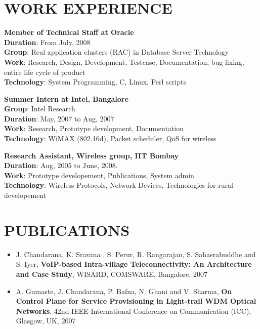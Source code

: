 \documentclass{res}
\begin{document}
\begin{resume}
					  \section{WORK EXPERIENCE} 
					  {\bf Member of Technical Staff at Oracle}
					  \\{\bf Duration}:  From July, 2008\\
					  {\bf Group}: Real application clusters (RAC) in Database Server Technology\\ 
					  {\bf Work}: Research, Design, Development, Testcase, Documentation, bug fixing, entire life cycle of product\\
					  {\bf Technology}: System Programming, C, Linux, Perl scripts

					  {\bf Summer Intern at Intel, Bangalore}\\
					  {\bf Group}: Intel Research 
					  \\{\bf Duration}: May, 2007 to Aug, 2007
					  \\{\bf Work}: Research, Prototype development, Documentation
					  \\{\bf Technology}: WiMAX (802.16d), Packet scheduler, QoS for wireless


					  {\bf Research Assistant, Wireless group, IIT Bombay} 
					  \\{\bf Duration}: Aug, 2005 to June, 2008.
					  \\{\bf Work}: Prototype developement, Publications, System admin
					  \\{\bf Technology}: Wireless Protocols, Network Devices, Technologies for rural developement  

					  \vspace{0.2in} 

				      \section{PUBLICATIONS} 
					  \begin{itemize}
					  \item  J. Chandarana, K. Sravana , S. Perur, R. Rangarajan, S. Sahasrabuddhe and S. Iyer, {\bf VoIP-based
					  Intra-village Teleconnectivity: An Architecture and Case Study}, WISARD, COMSWARE,
					  Bangalore, 2007

					  \item A. Gumaste, J. Chandarana, P. Bafna, N. Ghani and V. Sharma, {\bf On Control Plane for Service
					  Provisioning in Light-trail WDM Optical Networks}, 42nd IEEE International Conference on
					  Communication (ICC), Glasgow, UK, 2007


\end{itemize}
\end{resume}
\end{document}
